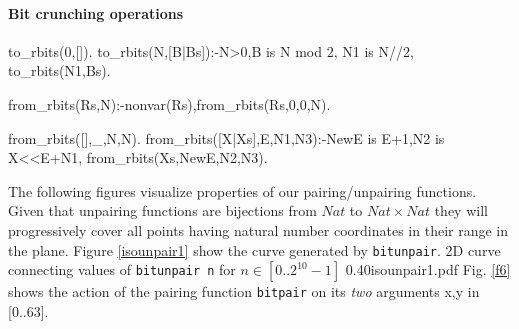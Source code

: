 \documentclass[]{INCLUDES/llncs}
\begin{document}
\paragraph{Bit crunching operations}
\begin{code}
to_rbits(0,[]).
to_rbits(N,[B|Bs]):-N>0,B is N mod 2, N1 is N//2,
  to_rbits(N1,Bs).

from_rbits(Rs,N):-nonvar(Rs),from_rbits(Rs,0,0,N).

from_rbits([],_,N,N).
from_rbits([X|Xs],E,N1,N3):-NewE is E+1,N2 is X<<E+N1,
  from_rbits(Xs,NewE,N2,N3).
\end{code}
The following figures visualize properties of our pairing/unpairing functions.
Given that unpairing functions are bijections from $Nat$ to $Nat \times Nat$
they will progressively cover all points having natural number coordinates in
their range in the plane. Figure \ref{isounpair1} 
show the curve generated by {\tt bitunpair}.
{2D curve connecting values of {\tt bitunpair n} for $n \in [0..2^{10}-1]$}
{0.40}{isounpair1.pdf}
Fig. \ref{f6} shows the action of the pairing function {\tt bitpair}
on its {\em two} arguments x,y in [0..63].
\end{document}
